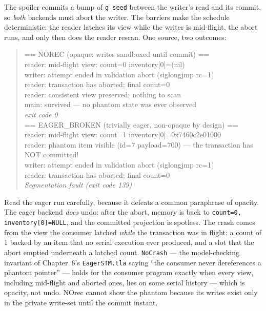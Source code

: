 The spoiler commits a bump of \texttt{g\_seed} between the writer's read and
its commit, so \emph{both} backends must abort the writer. The barriers make
the schedule deterministic: the reader latches its view while the writer is
mid-flight, the abort runs, and only then does the reader rescan. One source,
two outcomes:

\begin{quote}\ttfamily\small
== NOREC (opaque: writes sandboxed until commit) ==\\
reader: mid-flight view: count=0 inventory[0]=(nil)\\
writer: attempt ended in validation abort (siglongjmp rc=1)\\
reader: transaction has aborted; final count=0\\
reader: consistent view preserved; nothing to scan\\
main: survived --- no phantom state was ever observed\\
\hfill\emph{exit code 0}\\[2mm]
== EAGER\_BROKEN (trivially eager, non-opaque by design) ==\\
reader: mid-flight view: count=1 inventory[0]=0x7460c2e01000\\
reader: phantom item visible (id=7 payload=700) --- the transaction has NOT committed!\\
writer: attempt ended in validation abort (siglongjmp rc=1)\\
reader: transaction has aborted; final count=0\\
\hfill\emph{Segmentation fault (exit code 139)}
\end{quote}

Read the eager run carefully, because it defeats a common paraphrase of
opacity. The eager backend \emph{does} undo: after the abort, memory is back
to \texttt{count=0, inventory[0]=NULL}, and the committed projection is
spotless. The crash comes from the view the consumer latched \emph{while} the
transaction was in flight: a count of 1 backed by an item that no serial
execution ever produced, and a slot that the abort emptied underneath a latched
count. \texttt{NoCrash} --- the model-checking invariant of Chapter~6's
\texttt{EagerSTM.tla} saying ``the consumer never dereferences a phantom
pointer'' --- holds for the consumer program exactly when every view,
including mid-flight and aborted ones, lies on some serial history --- which
is opacity, not undo. NOrec cannot show the phantom because its writes exist
only in the private write-set until the commit instant.

